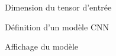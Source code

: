 \begin{frame}{Dimension du tensor d'entrée}
\end{frame}

\begin{frame}{Définition d'un modèle CNN}
\end{frame}

\begin{frame}{Affichage du modèle}
\end{frame}
